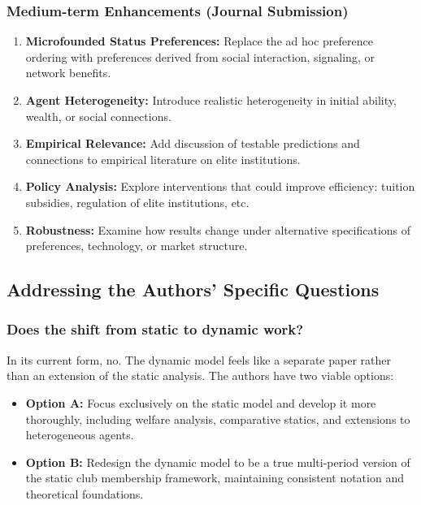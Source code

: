 \documentclass[12pt,letterpaper]{article}
\begin{document}
\subsubsection{Medium-term Enhancements (Journal Submission)}

\begin{enumerate}
	\item \textbf{Microfounded Status Preferences:} Replace the ad hoc preference ordering with preferences derived from social interaction, signaling, or network benefits.
	
	\item \textbf{Agent Heterogeneity:} Introduce realistic heterogeneity in initial ability, wealth, or social connections.
	
	\item \textbf{Empirical Relevance:} Add discussion of testable predictions and connections to empirical literature on elite institutions.
	
	\item \textbf{Policy Analysis:} Explore interventions that could improve efficiency: tuition subsidies, regulation of elite institutions, etc.
	
	\item \textbf{Robustness:} Examine how results change under alternative specifications of preferences, technology, or market structure.
\end{enumerate}

\subsection{Addressing the Authors' Specific Questions}

\subsubsection{Does the shift from static to dynamic work?}

In its current form, no. The dynamic model feels like a separate paper rather than an extension of the static analysis. The authors have two viable options:

\begin{itemize}
	\item \textbf{Option A:} Focus exclusively on the static model and develop it more thoroughly, including welfare analysis, comparative statics, and extensions to heterogeneous agents.
	
	\item \textbf{Option B:} Redesign the dynamic model to be a true multi-period version of the static club membership framework, maintaining consistent notation and theoretical foundations.
\end{itemize}
\end{document}
